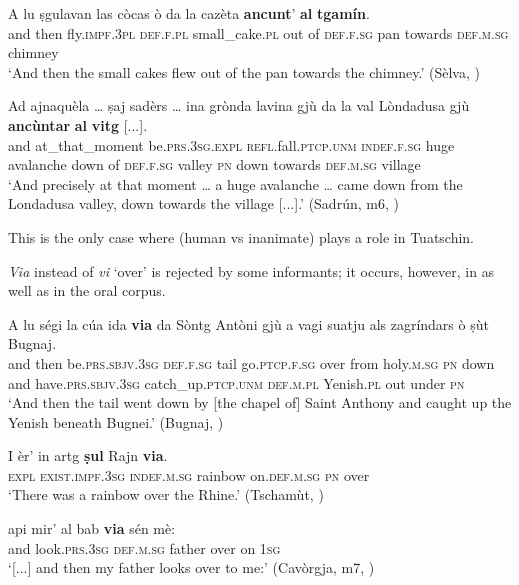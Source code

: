 \ea
\label{ancuntar3}
\gll A lu ṣgulavan las còcas ò da la cazèta \textbf{ancunt}' \textbf{al} \textbf{tgamín}.\\
and then fly.\textsc{impf.3pl} \textsc{def.f.pl} small\_cake.\textsc{pl} out of \textsc{def.f.sg} pan towards \textsc{def.m.sg} chimney\\
\glt `And then the small cakes flew out of the pan towards the chimney.' (Sèlva, \citealt[26]{Büchli1966})
\z

\ea
\label{ancuntar4}
\gll    Ad ajnaquèla … ṣaj sadèrs … ina grònda lavina gjù da la val Lòndadusa gjù \textbf{ancùntar} \textbf{al} \textbf{vitg} [...].\\
and at\_that\_moment {} be.\textsc{prs.3sg.expl} \textsc{refl.}fall.\textsc{ptcp.unm} {} \textsc{indef.f.sg} huge avalanche down of \textsc{def.f.sg} valley \textsc{pn} down towards \textsc{def.m.sg} village\\
\glt `And precisely at that moment … a huge avalanche … came down from the Londadusa valley, down towards the village [...].' (Sadrún, m6, )
\z

This is the only case where  (human vs inanimate) plays a role in Tuatschin.

\textit{Via} instead of \textit{vi} `over' is rejected by some informants; it occurs, however, in \citet{Büchli1966} as well as in the oral corpus.

\ea
\label{ex:via1}
\gll A lu ségi la cúa ida \textbf{via} da Sòntg Antòni gjù a vagi suatju als zagríndars ò ṣùt Bugnaj.\\
and then be.\textsc{prs.sbjv.3sg} \textsc{def.f.sg} tail go.\textsc{ptcp.f.sg} over from holy.\textsc{m.sg} \textsc{pn} down and have.\textsc{prs.sbjv.3sg} catch\_up.\textsc{ptcp.unm} \textsc{def.m.pl} Yenish.\textsc{pl} out under \textsc{pn}\\
\glt `And then the tail went down by [the chapel of] Saint Anthony and caught up the Yenish beneath Bugnei.' (Bugnaj, \citealt[132]{Büchli1966})
\z

\ea
\label{ex:via2}
\gll I èr' in artg \textbf{ṣul} Rajn \textbf{via}.\\
\textsc{expl} \textsc{exist.impf.3sg} \textsc{indef.m.sg} rainbow on.\textsc{def.m.sg} \textsc{pn} over\\
\glt `There was a rainbow over the Rhine.' (Tschamùt, \citealt[15]{Büchli1966})
\z

\ea
\label{ex:via3}
\gll  [...] api mir’ al bab \textbf{via} sén mè:\\
{} and look.\textsc{prs.3sg} \textsc{def.m.sg} father over on \textsc{1sg} \\
\glt `[...] and then my father looks over to me:' (Cavòrgja, m7, )
\z


